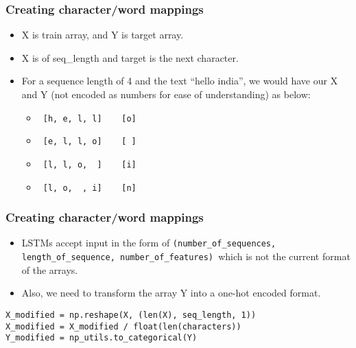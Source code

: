\begin{frame}[fragile]
  \frametitle{Creating character/word mappings}

  \begin{itemize}
  \item X is train array, and Y is  target array.
  \item X is of seq\_length and target is the next character.
  \item For a sequence length of 4 and the text ``hello india'', we would have our X and Y (not encoded as numbers for ease of understanding) as below:
    \begin{itemize}
  \item \lstinline| [h, e, l, l]	[o]|
  \item \lstinline| [e, l, l, o]	[ ]|
  \item \lstinline| [l, l, o,  ]	[i]|
  \item \lstinline| [l, o,  , i]	[n]|
  	  \end{itemize}
  	  \end{itemize}  	  
 \end{frame} 
 
\begin{frame}[fragile]
  \frametitle{Creating character/word mappings}

  \begin{itemize}
  \item LSTMs accept input in the form of \lstinline|(number_of_sequences, length_of_sequence, number_of_features) |which is not the current format of the arrays. 
  \item Also, we need to transform the array Y into a one-hot encoded format.
  	  \end{itemize}  	  
  	  
\begin{lstlisting}
X_modified = np.reshape(X, (len(X), seq_length, 1))
X_modified = X_modified / float(len(characters))
Y_modified = np_utils.to_categorical(Y)
\end{lstlisting}  	  
 \end{frame} 
 

